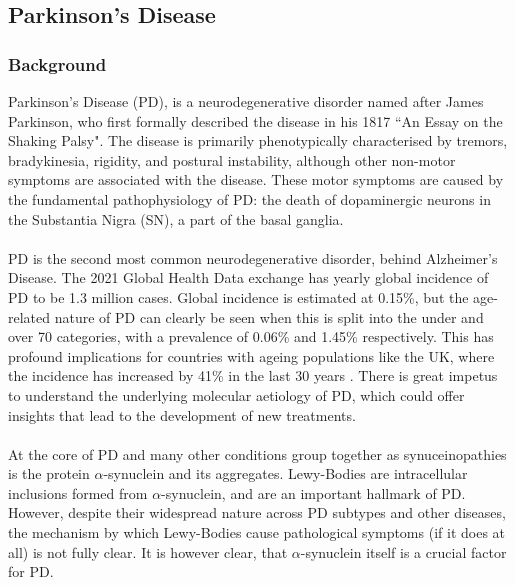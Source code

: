 \documentclass{article}
\begin{document}
\subsection{Parkinson's Disease}
\subsubsection{Background}  
\label{subsubsec:Background}
Parkinson's Disease (PD), is a neurodegenerative disorder named after James Parkinson, who first formally described the disease in his 1817 ``An Essay on the Shaking Palsy"\cite{Parkinson2002AnPalsy}. The disease is primarily phenotypically characterised by tremors, bradykinesia, rigidity, and postural instability, although other non-motor symptoms are associated with the disease. These motor symptoms are caused by the fundamental pathophysiology of PD: the death of dopaminergic neurons in the Substantia Nigra (SN), a part of the basal ganglia. 
\\
\\PD is the second most common neurodegenerative disorder, behind Alzheimer's Disease. The 2021 Global Health Data exchange\cite{Ferrari2024Global2021} has yearly global incidence of PD to be 1.3 million cases. Global incidence is estimated at 0.15\%, but the age-related nature of PD can clearly be seen when this is split into the under and over 70 categories, with a prevalence of 0.06\% and 1.45\% respectively. This has profound implications for countries with ageing populations like the UK, where the incidence has increased by 41\% in the last 30 years \cite{Ferrari2024Global2021}. There is great impetus to understand the underlying molecular aetiology of PD, which could offer insights that lead to the development of new treatments.
\\
\\At the core of PD and many other conditions group together as synuceinopathies is the protein $\alpha$-synuclein and its aggregates. Lewy-Bodies are intracellular inclusions formed from $\alpha$-synuclein\cite{Spillantini1997-SynucleinBodies}, and are an important hallmark of PD. However, despite their widespread nature across PD subtypes and other diseases, the mechanism by which Lewy-Bodies cause pathological symptoms (if it does at all) is not fully clear\cite{Riederer2023LewyDisease}. It is however clear, that $\alpha$-synuclein itself is a crucial factor for PD.
\end{document}
